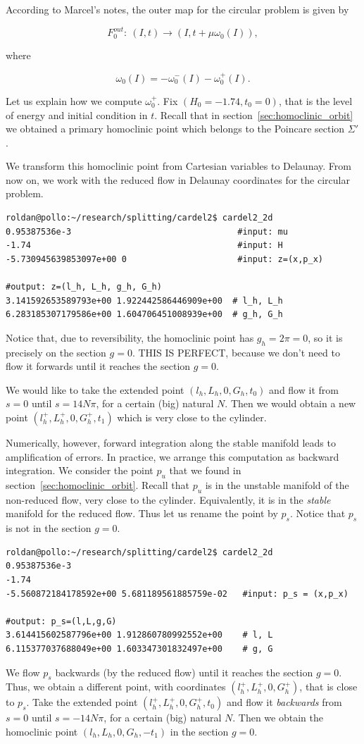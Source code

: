\documentclass[a4paper]{amsart}
\theoremstyle{remark}
\begin{document}
According to Marcel's notes, the outer map for the circular problem is
given by

\[ F_0^{out}\colon\ (I,t)\to (I, t+\mu \omega_0(I)), \]

where

\[ \omega_0(I) = -\omega_0^-(I) -\omega_0^+(I). \]

Let us explain how we compute $\omega_0^+$. Fix $(H_0=-1.74,t_0=0)$,
that is the level of energy and initial condition in $t$. 
Recall that in section~\ref{sec:homoclinic_orbit} we obtained a
primary homoclinic point which belongs to the Poincare section
$\Sigma'$. 

We transform this homoclinic point from Cartesian variables to
Delaunay. From now on, we work with the reduced flow in Delaunay
coordinates for the circular problem. 

\begin{verbatim}
roldan@pollo:~/research/splitting/cardel2$ cardel2_2d 
0.95387536e-3                                 #input: mu
-1.74                                         #input: H
-5.730945639853097e+00 0                      #input: z=(x,p_x)

#output: z=(l_h, L_h, g_h, G_h)
3.141592653589793e+00 1.922442586446909e+00  # l_h, L_h
6.283185307179586e+00 1.604706451008939e+00  # g_h, G_h
\end{verbatim}
Notice that, due to reversibility, the homoclinic point has
$g_h=2\pi=0$, so it is precisely on the section $g=0$. 
THIS IS PERFECT, because we don't need to flow it forwards until it
reaches the section $g=0$.

We would like to take the extended point $(l_h, L_h, 0, G_h, t_0)$ and
flow it from $s=0$ until $s=14 N\pi$, for a certain (big) natural $N$. 
Then we would obtain a new point $(l_h^+, L_h^+, 0, G_h^+, t_1)$ which
is very close to the cylinder.

Numerically, however, forward integration along the stable manifold
leads to amplification of errors.
In practice, we arrange this computation as backward integration.
We consider the point $p_u$ that we found in
section~\ref{sec:homoclinic_orbit}. 
Recall that $p_u$ is in the unstable manifold of the non-reduced flow,
very close to the cylinder. 
Equivalently, it is in the \emph{stable} manifold for the reduced
flow. Thus let us rename the point by $p_s$.
Notice that $p_s$ is not in the section $g=0$.
\begin{verbatim}
roldan@pollo:~/research/splitting/cardel2$ cardel2_2d 
0.95387536e-3
-1.74
-5.560872184178592e+00 5.681189561885759e-02   #input: p_s = (x,p_x)

#output: p_s=(l,L,g,G)
3.614415602587796e+00 1.912860780992552e+00    # l, L
6.115377037688049e+00 1.603347301832497e+00    # g, G
\end{verbatim}
We flow $p_s$ backwards (by the reduced flow) until it reaches the
section $g=0$. 
Thus, we obtain a different point, with coordinates $(l_h^+, L_h^+, 0,
G_h^+)$, that is close to $p_s$. 
Take the extended point $(l_h^+, L_h^+, 0, G_h^+, t_0)$ and
flow it \emph{backwards} from $s=0$ until $s=-14 N\pi$, for a certain
(big) natural $N$.
Then we obtain the homoclinic point $(l_h, L_h, 0, G_h, -t_1)$ in the
section $g=0$.
\end{document}
